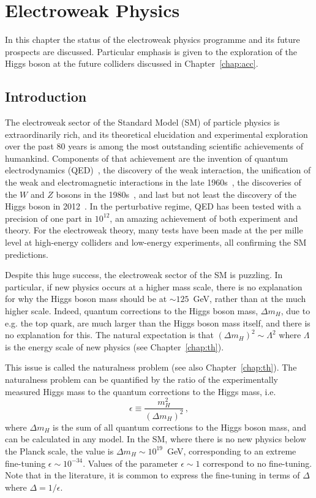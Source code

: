 \documentclass[../report.tex]{subfiles}
\newcommand{\ew}{electroweak\xspace}
\newcommand{\commentsinout}[1]{#1}
\newcommand{\BH}[1]{\commentsinout{\textbf{\color{blue} [BH: #1]}}} %
\begin{document}
\linenumbers
\chapter{Electroweak Physics}
\label{chap:ew}
In this chapter the status of the \ew physics programme and its future prospects are discussed. Particular emphasis is given to the exploration of the Higgs boson at the future colliders discussed in Chapter~\ref{chap:acc}.

\section{Introduction}
\label{sec:ewkintro}
The \ew sector of the Standard Model (SM) of particle physics is extraordinarily rich, and its theoretical elucidation and experimental exploration over the past 80 years is among the most outstanding scientific achievements of humankind. Components of that achievement are the invention of quantum electrodynamics (QED)~\cite{Dirac:1927dy}, the discovery of the weak interaction\cite{Fermi:1934hr,Sudarshan:1958vf,Feynman:1958ty}, the unification of the weak and electromagnetic interactions in the late 1960s~\cite{Weinberg:1967tq,Salam:1968rm}, the discoveries of the $W$ and $Z$ bosons in the 1980s~\cite{Rubbia:1985pv}, and last but not least the discovery of the Higgs boson in 2012~\cite{Aad:2012tfa,Chatrchyan:2012xdj}. In the perturbative regime, QED has been tested with a precision of one part in $10^{12}$, an amazing achievement of both experiment and theory. For the \ew theory, many tests have been made at the per mille level at high-energy colliders and low-energy experiments, all confirming the SM predictions.

Despite this huge success, the \ew sector of the SM is puzzling. In particular, if new physics occurs at a higher mass scale, there is no explanation for why the Higgs boson mass should be at $\sim 125$~GeV, rather than at the much higher scale. 
Indeed, quantum corrections to the Higgs boson mass, $\Delta m_H$, due to e.g. the top quark, are much larger than the Higgs boson mass itself, and there is no explanation for this. The natural expectation is that $(\Delta m_H)^2 \sim \Lambda^2$ where $\Lambda$ is the energy scale of new physics (see Chapter~\ref{chap:th}). 

This issue is called the naturalness problem (see also Chapter~\ref{chap:th}). The naturalness problem can be quantified by the ratio of the experimentally measured Higgs mass to the quantum corrections to the Higgs mass, i.e.
\begin{equation}
    \epsilon \equiv \frac{m_H^2}{(\Delta m_H)^2}\,,
\end{equation}
where $\Delta m_H$ is the sum of all quantum corrections to the Higgs boson mass, and can be calculated in any model. In the SM, where there is no new physics below the Planck scale, the value is $\Delta m_H\sim 10^{19}$~GeV, corresponding to an extreme fine-tuning $\epsilon\sim 10^{-34}$. Values of the parameter $\epsilon \sim 1$ correspond to no fine-tuning. Note that in the literature, it is common to express the fine-tuning in terms of $\Delta$ where $\Delta=1/\epsilon$.
\end{document}
